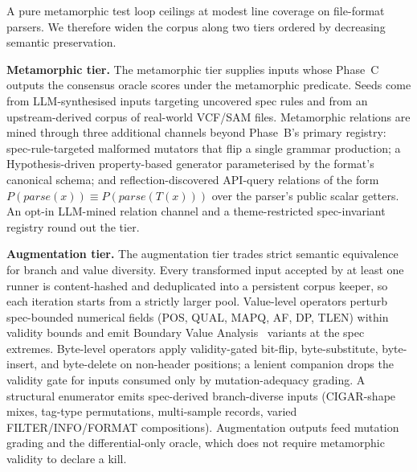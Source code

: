 A pure metamorphic test loop ceilings at modest line coverage on
file-format parsers. We therefore widen the corpus along two
tiers ordered by decreasing semantic preservation.

\textbf{Metamorphic tier.} The metamorphic tier supplies inputs
whose Phase~C outputs the consensus oracle scores under the
metamorphic predicate. Seeds come from LLM-synthesised inputs
targeting uncovered spec rules and from an upstream-derived
corpus of real-world VCF/SAM files. Metamorphic relations are
mined through three additional channels beyond Phase~B's primary
registry: spec-rule-targeted malformed mutators that flip a
single grammar production; a Hypothesis-driven property-based
generator parameterised by the format's canonical schema; and
reflection-discovered API-query relations of the form
$P(\mathit{parse}(x)) \equiv P(\mathit{parse}(T(x)))$ over the
parser's public scalar getters. An opt-in LLM-mined relation
channel and a theme-restricted spec-invariant registry round out
the tier.

\textbf{Augmentation tier.} The augmentation tier trades strict
semantic equivalence for branch and value diversity. Every
transformed input accepted by at least one runner is
content-hashed and deduplicated into a persistent corpus keeper,
so each iteration starts from a strictly larger pool. Value-level
operators perturb spec-bounded numerical fields (POS, QUAL, MAPQ,
AF, DP, TLEN) within validity bounds and emit Boundary Value
Analysis~\citep{myers1979art} variants at the spec extremes.
Byte-level operators apply validity-gated bit-flip,
byte-substitute, byte-insert, and byte-delete on non-header
positions; a lenient companion drops the validity gate for inputs
consumed only by mutation-adequacy grading. A structural
enumerator emits spec-derived branch-diverse inputs (CIGAR-shape
mixes, tag-type permutations, multi-sample records, varied
FILTER/INFO/FORMAT compositions). Augmentation outputs feed
mutation grading and the differential-only oracle, which does not
require metamorphic validity to declare a kill.

